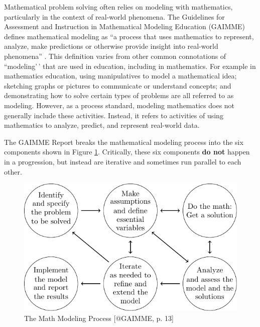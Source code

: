 \documentclass[
]{book}
\theoremstyle{definition}
\theoremstyle{definition}
\theoremstyle{definition}
\theoremstyle{definition}
\theoremstyle{remark}
\begin{document}
Mathematical problem solving often relies on modeling with mathematics, particularly in the context of real-world phenomena. The Guidelines for Assessment and Instruction in Mathematical Modeling Education (GAIMME) defines mathematical modeling as ``a process that uses mathematics to represent, analyze, make predictions or otherwise provide insight into real-world phenomena'' \citep[p.~8]{GAIMME}. This definition varies from other common connotations of ``modeling'\,' that are used in education, including in mathematics. For example in mathematics education, using manipulatives to model a mathematical idea; sketching graphs or pictures to communicate or understand concepts; and demonstrating how to solve certain types of problems are all referred to as modeling. However, as a process standard, modeling mathematics does not generally include these activities. Instead, it refers to activities of using mathematics to analyze, predict, and represent real-world data.

The GAIMME Report breaks the mathematical modeling process into the six components shown in Figure \ref{fig:GAIMME}. Critically, these six components \textbf{do not} happen in a progression, but instead are iterative and sometimes run parallel to each other.

\begin{figure}

{\centering \includegraphics[width=0.7\linewidth]{tikz/GAIMME} 

}

\caption{The Math Modeling Process [@GAIMME, p. 13]}\label{fig:GAIMME}
\end{figure}
\end{document}
